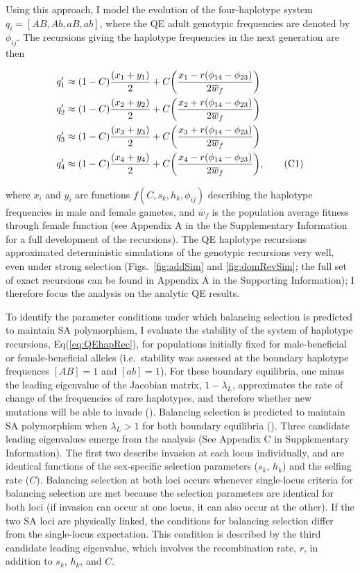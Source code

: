 \documentclass{article}
\newcommand\numberthis{\addtocounter{equation}{1}\tag{\theequation}}
\begin{document}
Using this approach, I model the evolution of the four-haplotype system $q_i = [AB, Ab, aB, ab]$, where the QE adult genotypic frequencies are denoted by $\phi_{ij}$. The recursions giving the haplotype frequencies in the next generation are then

\begin{align*} \label{eq:QEhapRec}
	q'_1 &\approx (1 - C) \frac{(x_1 + y_1)}{2} + C \bigg( \frac{x_1 - r(\phi_{14} - \phi_{23})}{2 \overline{w}_f} \bigg) \\
	q'_2 &\approx (1 - C) \frac{(x_2 + y_2)}{2} + C \bigg( \frac{x_2 + r(\phi_{14} - \phi_{23})}{2 \overline{w}_f} \bigg) \\
	q'_3 &\approx (1 - C) \frac{(x_3 + y_3)}{2} + C \bigg( \frac{x_3 + r(\phi_{14} - \phi_{23})}{2 \overline{w}_f} \bigg) \\
	q'_4 &\approx (1 - C) \frac{(x_4 + y_4)}{2} + C \bigg( \frac{x_4 - r(\phi_{14} - \phi_{23})}{2 \overline{w}_f} \bigg), \numberthis
\end{align*}

\noindent{} where $x_i$ and $y_i$ are functions $f(C, s_k, h_k, \phi_{ij})$ describing the haplotype frequencies in male and female gametes, and $\overline{w}_f$ is the population average fitness through female function (see Appendix A in the the Supplementary Information for a full development of the recursions). The QE haplotype recursions approximated deterministic simulations of the genotypic recursions very well, even under strong selection (Figs.~\ref{fig:addSim} and \ref{fig:domRevSim}; the full set of exact recursions can be found in Appendix A in the Supporting Information); I therefore focus the analysis on the analytic QE results. 

To identify the parameter conditions under which balancing selection is predicted to maintain SA polymorphism, I evaluate the stability of the system of haplotype recursions, Eq(\ref{eq:QEhapRec}), for populations initially fixed for male-beneficial or female-beneficial alleles (i.e.~stability was assessed at the boundary haplotype frequences $[AB]=1$ and $[ab]=1$). For these boundary equilibria, one minus the leading eigenvalue of the Jacobian matrix, $1 - \lambda_L$, approximates the rate of change of the frequencies of rare haplotypes, and therefore whether new mutations will be able to invade (\citealt{OttoDay2007}). Balancing selection is predicted to maintain SA polymorphism when $\lambda_L > 1$ for both boundary equilibria (\citealt{Prout1968}). Three candidate leading eigenvalues emerge from the analysis (See Appendix C in Supplementary Information). The first two describe invasion at each locus individually, and are identical functions of the sex-specific selection parameters ($s_k$, $h_k$) and the selfing rate ($C$). Balancing selection at both loci occurs whenever single-locus criteria for balancing selection are met because the selection parameters are identical for both loci (if invasion can occur at one locus, it can also occur at the other). If the two SA loci are physically linked, the conditions for balancing selection differ from the single-locus expectation. This condition is described by the third candidate leading eigenvalue, which involves the recombination rate, $r$, in addition to $s_k$, $h_k$, and $C$.
\end{document}
